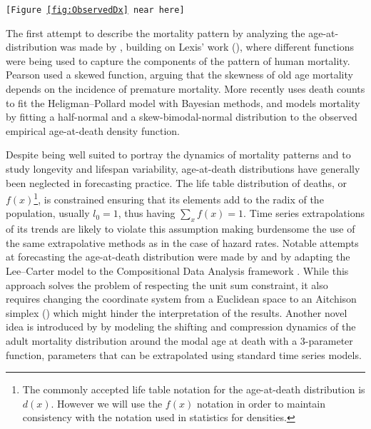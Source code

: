 \documentclass[T0_MEM]{subfiles}
\begin{document}
\begin{center}\texttt{[Figure \ref{fig:ObservedDx} near here]} %
\end{center}

The first attempt to describe the mortality pattern by analyzing the age-at-distribution was made by \cite{pearson1897}, building on Lexis' work (\citeyear{lexis1879}), where different functions were being used to capture the components of the pattern of human mortality. Pearson used a skewed function, arguing that the skewness of old age mortality depends on the incidence of premature mortality. More recently \cite{dellaportas2001} uses death counts to fit the Heligman--Pollard model with Bayesian methods, and \cite{mazzuco2018} models mortality by fitting a half-normal and a skew-bimodal-normal distribution to the observed empirical age-at-death density function.

Despite being well suited to portray the dynamics of mortality patterns and to study longevity and lifespan variability, age-at-death distributions have generally been neglected in forecasting practice. The life table distribution of deaths, or $f(x)$\footnote{The commonly accepted life table notation for the age-at-death distribution is $d(x)$. However we will use the $f(x)$ notation in order to maintain consistency with the notation used in statistics for densities.}, is constrained ensuring that its elements add to the radix of the population, usually $l_0 = 1$, thus having $\sum_{x} f(x) = 1$. Time series extrapolations of its trends are likely to violate this assumption making burdensome the use of the same extrapolative methods as in the case of hazard rates. Notable attempts at forecasting the age-at-death distribution were made by \cite{oeppen2008} and \cite{bergeron2017} by adapting the Lee--Carter model to the Compositional Data Analysis framework \citep{aitchison1982}. While this approach solves the problem of respecting the unit sum constraint, it also requires changing the coordinate system from a Euclidean space to an Aitchison simplex (\citeyear{aitchison1986}) which might hinder the interpretation of the results. Another novel idea is introduced by \cite{basellini2019} by modeling the shifting and compression dynamics of the adult mortality distribution around the modal age at death with a 3-parameter function, parameters that can be extrapolated using standard time series models.
\end{document}
